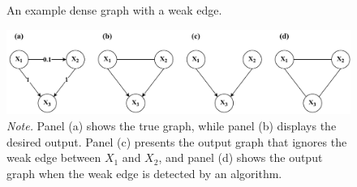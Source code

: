 \documentclass[twoside, 11pt]{article}
\newcommand*{\figref}[2][]{%
  \hyperref[{fig:#2}]{%
    Figure~\ref*{fig:#2}%
    \ifx\\#1\\%
    \else
      #1%
    \fi
  }%
}
\begin{document}


\begin{figure}[!t]
    \centering
        \caption{An example dense graph with a weak edge.}
        \vspace{1mm}
        \includegraphics[width=1\textwidth]{figures/Fig17.pdf}
        \vspace{1mm}
        \caption*{\small{\textit{Note.} Panel (a) shows the true graph, while panel (b) displays the desired output. Panel (c) presents the output graph that ignores the weak edge between $X_1$ and $X_2$, and panel (d) shows the output graph when the weak edge is detected by an algorithm.}}
    \label{fig:19}
\end{figure}
\end{document}
